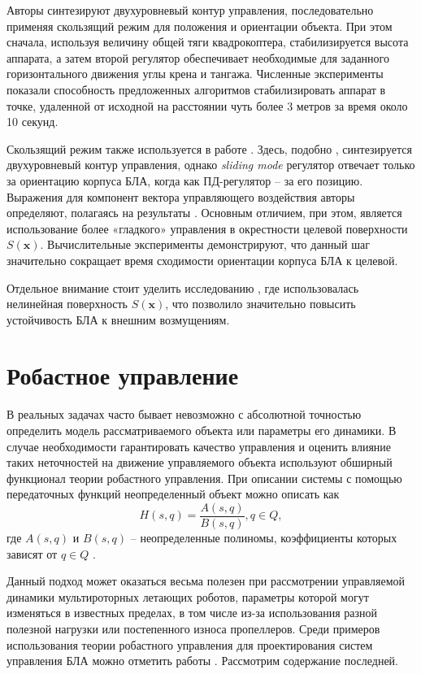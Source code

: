 Авторы синтезируют двухуровневый контур управления, последовательно применяя скользящий режим для положения и ориентации объекта. При этом сначала, используя величину общей тяги квадрокоптера, стабилизируется высота аппарата, а затем второй регулятор обеспечивает необходимые для заданного горизонтального движения углы крена и тангажа. Численные эксперименты показали способность предложенных алгоритмов стабилизировать аппарат в точке, удаленной от исходной на расстоянии чуть более 3 метров за время около 10 секунд.

Скользящий режим также используется в работе \cite{Runcharoon01}. Здесь, подобно \cite{Samir01}, синтезируется двухуровневый контур управления, однако \textit{sliding mode} регулятор отвечает только за ориентацию корпуса БЛА, когда как ПД-регулятор -- за его позицию. Выражения для компонент вектора управляющего воздействия авторы определяют, полагаясь на результаты \cite{Slotine01}. Основным отличием, при этом, является использование более «гладкого» управления в окрестности целевой поверхности $S(\bm x)$. Вычислительные эксперименты демонстрируют, что данный шаг значительно сокращает время сходимости  ориентации корпуса БЛА к целевой. 

Отдельное внимание стоит уделить исследованию \cite{Sumantri01}, где использовалась нелинейная поверхность $S(\bm x)$, что позволило значительно повысить устойчивость БЛА к внешним возмущениям.

\section{Робастное управление}

В реальных задачах часто бывает невозможно с абсолютной точностью определить модель рассматриваемого объекта или параметры его динамики.
В случае необходимости гарантировать качество управления и оценить влияние таких неточностей на движение управляемого объекта используют обширный функционал теории робастного управления.
При описании системы с помощью передаточных функций неопределенный объект можно описать как
\begin{equation} \label{eq:robust_ctrl_obj}
H(s, q) = \frac{A(s, q)}{B(s, q)}, q \in Q,
\end{equation}
где $A(s, q)$ и $B(s, q)$ -- неопределенные полиномы, коэффициенты которых зависят от $q \in Q$ \cite{Polyak01}. 

Данный подход может оказаться весьма полезен при рассмотрении управляемой динамики
мультироторных летающих роботов, параметры которой могут изменяться в известных пределах, в том числе из-за использования разной полезной нагрузки или постепенного износа пропеллеров. Среди примеров использования теории робастного управления для проектирования систем управления БЛА можно отметить работы \cite{Lee02, Borisov01, Petranevsky01, Bai01, Tony01}. Рассмотрим содержание последней.


